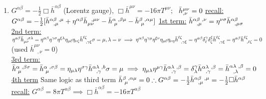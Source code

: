 \documentclass[12pt]{amsart}
\begin{document}
\begin{enumerate}
\item \underline{$G^{\alpha \beta} = - \frac{1}{2} \Box \bar{h}^{\alpha \beta}$} (Lorentz gauge), $\Box \bar{h}^{\mu \nu}=-16 \pi T^{\mu \nu};$ $\,\, \bar{h}^{\mu \nu}_{, \nu} = 0\\$
\underline{recall:} $G^{\alpha \beta} =  - \frac{1}{2}[\bar{h}^{\alpha \beta\,\,,\mu}_{\,\,\,\,,\mu} + \eta^{\alpha \beta} \bar{h}_{\mu \nu}^{\,\, \,\,,\mu \nu} - \bar{h}^{\alpha \,\, , \beta \mu}_{\,\,\mu} - \bar{h}^{\beta\,\, , \alpha \mu}_{\,\,\mu}]\\$
\underline{1st term:} $\bar{h}^{\alpha \beta \,\,, \nu}_{\,\,\,\,, \mu} = \eta^{\nu \sigma} \bar{h}^{\alpha \beta}_{\,\,\,\,, \mu \sigma}\\$
\underline{2nd term:} $\eta^{\alpha \beta} \bar{h}_{\mu \nu}^{\,\,\,\, , \sigma \lambda} = \eta^{\alpha \beta} \eta^{\gamma \sigma} \eta^{\xi \lambda} \eta_{\mu \ell} \eta_{\nu \zeta} \bar{h}^{\ell \zeta}_{\,\,\,\,, \gamma \xi}\\
\sigma = \mu, \lambda = \nu \implies \eta^{\alpha \beta} \eta^{\gamma \mu} \eta^{\xi \nu} \eta_{\mu \ell} \eta_{\nu \eta} \bar{h}^{\ell \zeta}_{\,\,\,\,, \gamma \xi}\\
= \eta^{\alpha \beta} \delta ^{\gamma}_{\ell} \delta ^{\xi}_{\zeta} \bar{h}^{\ell \zeta}_{\,\, \,\,, \gamma \xi} = \eta^{\alpha \beta} \bar{h}^{\ell \zeta}_{\,\,\,\,, \ell \zeta} = 0$ (used $\bar{h}^{\mu \nu}_{\,\,\,\, , \nu}=0$)\\
\underline{3rd term:} $\bar{h}^{\alpha\,\, , \beta \sigma}_{\,\,\mu} = \bar{h}^{\alpha\,\,, \sigma \beta}_{\,\,\mu} = \eta_{\mu \lambda} \eta^{\sigma \gamma} \bar{h}^{\alpha \lambda\,\, , b}_{\,\,\,\,, \gamma}\\
\sigma = \mu \implies \eta_{\mu \lambda} \eta^{\mu \gamma} \bar{h}^{\alpha \lambda\,\, , \beta}_{\,\,\,\,, \gamma} = \delta^{\gamma}_{\lambda} \bar{h}^{\alpha \lambda\,\, , \beta}_{\,\,\,\,, \gamma} = \bar{h}^{\alpha \lambda\,\, , \beta}_{\,\,\,\,, \lambda} = 0\\$
\underline{4th term} Same logic as third term $\bar{h}^{\beta\,\, , \alpha \mu}_{ \,\,\mu} = 0\\
\therefore G^{\alpha \beta} = - \frac{1}{2} \bar{h}^{\alpha \beta\, \,\, , \mu}_{\,\, \,\,, \mu} = - \frac{1}{2} \Box \bar{h}^{\alpha \beta}\\$
\underline{recall:} $G^{\alpha \beta} = 8 \pi T^{\alpha \beta} \implies \Box \bar{h}^{\alpha \beta} = -16 \pi T^{\alpha \beta}$


\hdashrule[0.5ex][c]{\linewidth}{0.5pt}{1.5mm}



\end{enumerate}
\end{document}
